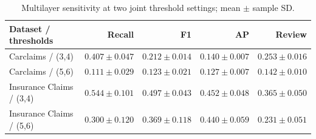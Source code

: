 \begin{table}[!htbp]\centering\footnotesize
\caption{Multilayer sensitivity at two joint threshold settings; mean $\pm$ sample SD.}\label{tab:thresholds}
\setlength{\tabcolsep}{2pt}
\begin{tabular}{lrrrr}\toprule
Dataset / thresholds & Recall & F1 & AP & Review\\\midrule
Carclaims / (3,4) & $0.407 \pm 0.047$ & $0.212 \pm 0.014$ & $0.140 \pm 0.007$ & $0.253 \pm 0.016$\\
Carclaims / (5,6) & $0.111 \pm 0.029$ & $0.123 \pm 0.021$ & $0.127 \pm 0.007$ & $0.142 \pm 0.010$\\
Insurance Claims / (3,4) & $0.544 \pm 0.101$ & $0.497 \pm 0.043$ & $0.452 \pm 0.048$ & $0.365 \pm 0.050$\\
Insurance Claims / (5,6) & $0.300 \pm 0.120$ & $0.369 \pm 0.118$ & $0.440 \pm 0.059$ & $0.231 \pm 0.051$\\
\bottomrule\end{tabular}
\end{table}
